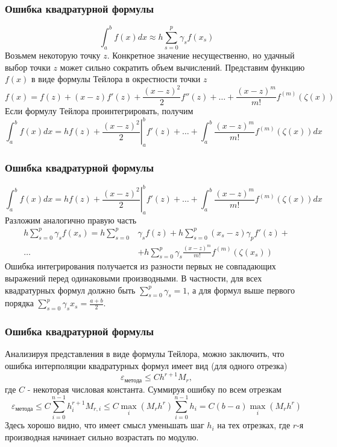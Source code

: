 \documentclass[apectratio=43,unicode]{beamer}
\begin{document}
\begin{frame}
\frametitle{Ошибка квадратурной формулы}
	\[
	\int_a^b f(x) dx \approx h \sum_{s=0}^p \gamma_s f(x_s)
	\]
	Возьмем некоторую точку $z$. Конкретное значение несущественно, но удачный выбор точки $z$ может сильно сократить объем
	вычислений. \pause Представим функцию $f(x)$ в виде формулы Тейлора в окрестности точки $z$
	\[
	f(x) = f(z) + (x-z)f'(z) + \frac{(x-z)^2}{2}f''(z) + \dots + \frac{(x-z)^{m}}{m!}f^{(m)}(\zeta(x))
	\]
	Если формулу Тейлора проинтегрировать, получим
	\[
	\int_a^b f(x) dx = h f(z) + \left.\frac{(x-z)^2}{2}\right|_a^b f'(z) + \dots + \int_a^b \frac{(x-z)^{m}}{m!}f^{(m)}(\zeta(x)) dx
	\]
\end{frame}

\begin{frame}
\frametitle{Ошибка квадратурной формулы}
	\[
	\int_a^b f(x) dx = h f(z) + \left.\frac{(x-z)^2}{2}\right|_a^b f'(z) + \dots + \int_a^b \frac{(x-z)^{m}}{m!}f^{(m)}(\zeta(x)) dx
	\]
	Разложим аналогично правую часть
	\begin{align*}
		h \sum_{s=0}^p \gamma_s f(x_s) = h \sum_{s=0}^p &\gamma_s f(z) + h \sum_{s=0}^p (x_s-z)\gamma_p f'(z) + \\
	\dots&+ h \sum_{s=0}^p \gamma_s \frac{(x-z)^{m}}{m!} f^{(m)}(\zeta(x_s))
	\end{align*}
	Ошибка интегрирования получается из разности первых не совпадающих выражений перед одинаковыми производными. В частности, для всех
	квадратурных формул должно быть $\sum_{s=0}^p \gamma_s = 1$, а для формул выше первого порядка $\sum_{s=0}^p \gamma_s x_s = \frac{a+b}{2}$.
\end{frame}

\begin{frame}
\frametitle{Ошибка квадратурной формулы}
	Анализируя представления в виде формулы Тейлора, можно заключить, что
	ошибка интерполяции квадратурных формул имеет вид (для одного отрезка)
	\[
	\varepsilon_{\text{метода}} \leq C h^{r+1} M_r,
	\]
	где $C$ - некоторая числовая константа.
	Суммируя ошибку по всем отрезкам
	\[
	\varepsilon_{\text{метода}} \leq C \sum_{i=0}^{n-1} h_i^{r+1} M_{r,i} \leq C \max_i \left(M_r h^r\right)
	\sum_{i=0}^{n-1} h_i = C(b-a)\max_i \left(M_r h^r\right)
	\]
	Здесь хорошо видно, что имеет смысл уменьшать шаг $h_i$ на тех отрезках, где $r$-я производная начинает
	сильно возрастать по модулю.
\end{frame}
\end{document}
